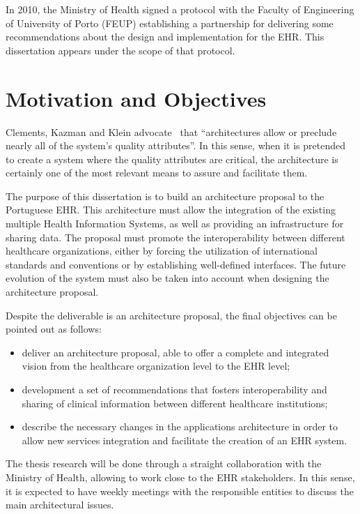 In 2010, the Ministry of Health signed a protocol with the Faculty of Engineering of University of Porto (FEUP) establishing a partnership for delivering some recommendations about the design and implementation for the EHR. This dissertation appears under the scope of that protocol.

\section{Motivation and Objectives} \label{sec:goals}

Clements, Kazman and Klein advocate~\citep{Clements2001} that ``architectures allow or preclude nearly all of the system's quality attributes''. In this sense, when it is pretended to create a system where the quality attributes are critical, the architecture is certainly one of the most relevant means to assure and facilitate them.

The purpose of this dissertation is to build an architecture proposal to the Portuguese EHR. This architecture must allow the integration of the existing multiple Health Information Systems, as well as providing an infrastructure for sharing data. The proposal must promote the interoperability between different healthcare organizations, either by forcing the utilization of international standards and conventions or by establishing well-defined interfaces. The future evolution of the system must also be taken into account when designing the architecture proposal.

Despite the deliverable is an architecture proposal, the final objectives can be pointed out as follows:
\begin{itemize}
\item deliver an architecture proposal, able to offer a complete and integrated vision from the healthcare organization level to the EHR level;
\item development a set of recommendations that fosters interoperability and sharing of clinical information between different healthcare institutions;
\item describe the necessary changes in the applications architecture in order to allow new services integration and facilitate the creation of an EHR system.
\end{itemize}

The thesis research will be done through a straight collaboration with the Ministry of Health, allowing to work close to the EHR stakeholders. In this sense, it is expected to have weekly meetings with the responsible entities to discuss the main architectural issues.


